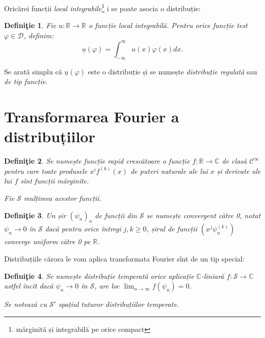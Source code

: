 \documentclass[12pt,a4paper]{article}
\newcommand\kal{\mathcal}
\newcommand\ds{\displaystyle}
\newcommand\RR{\mathbb{R}}
\newcommand\CC{\mathbb{C}}
\theoremstyle{dotless}
\theoremstyle{dotlessdr}
\newtheorem{definition}{Defini\c{t}ie}
\begin{document}
Oricărei funcții \emph{local integrabile}\footnote{mărginită și integrabilă pe orice compact}
i se poate asocia o distribuție:

\begin{definition}\label{def:functie-distr}
  Fie $ u : \RR \to \RR $ o funcție local integrabilă. Pentru orice funcție test
  $ \varphi \in \kal{D} $, definim:
  \[
    \underline{u}(\varphi) = \int_{-\infty}^\infty u(x) \varphi(x) dx.
  \]
\end{definition}

Se arată simplu că $ \underline{u}(\varphi) $ este o distribuție și se numește
\emph{distribuție regulată} sau \emph{de tip funcție}.


\section*{Transformarea Fourier a distribuțiilor}

\begin{definition}\label{def:f-rapid-c}
  Se numește \emph{funcție rapid crescătoare} o funcție $ f : \RR \to \CC $ de clasă
  $ \kal{C}^\infty $ pentru care toate produsele $ x^i f^{(k)} (x) $ de puteri naturale
  ale lui $ x $ și derivate ale lui $ f $ sînt funcții mărginite.

  Fie $ \kal{S} $ mulțimea acestor funcții.
\end{definition}

\begin{definition}\label{def:s-sir-c}
  Un șir $ (\psi_n)_n $ de funcții din $ \kal{S} $ se numește \emph{convergent către 0},
  notat $ \psi_n \to 0 $ în $ \kal{S} $ dacă pentru orice întregi $ j, k \geq 0 $,
  șirul de funcții $ ( x^j \psi_n^{(k)} ) $ converge uniform către 0 pe $ \RR $.
\end{definition}

Distribuțiile cărora le vom aplica transformata Fourier sînt de un tip special:

\begin{definition}\label{def:distr-temp}
  Se numește \emph{distribuție temperată} orice aplicație $ \CC $-liniară
  $ f : \kal{S} \to \CC $ astfel încît dacă $ \psi_n \to 0 $ în $ \kal{S} $,
  are loc $ \ds\lim_{n \to \infty} f(\psi_n) = 0 $.

  Se notează cu $ \kal{S}' $ spațiul tuturor distribuțiilor temperate.
\end{definition}
\end{document}
